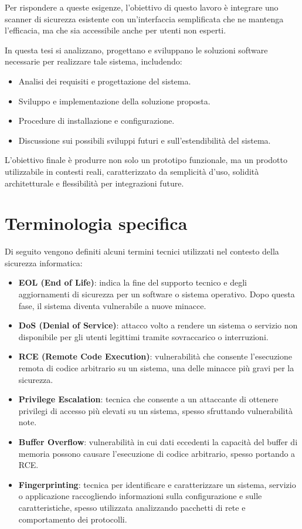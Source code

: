 Per rispondere a queste esigenze, l'obiettivo di questo lavoro è integrare uno scanner di sicurezza esistente con un'interfaccia semplificata che ne mantenga l'efficacia, ma che sia accessibile anche per utenti non esperti.

In questa tesi si analizzano, progettano e sviluppano le soluzioni software necessarie per realizzare tale sistema, includendo:
\begin{itemize}
    \item Analisi dei requisiti e progettazione del sistema.
    \item Sviluppo e implementazione della soluzione proposta.
    \item Procedure di installazione e configurazione.
    \item Discussione sui possibili sviluppi futuri e sull'estendibilità del sistema.
\end{itemize}

L'obiettivo finale è produrre non solo un prototipo funzionale, ma un prodotto utilizzabile in contesti reali, caratterizzato da semplicità d'uso, solidità architetturale e flessibilità per integrazioni future.

\section{Terminologia specifica}
Di seguito vengono definiti alcuni termini tecnici utilizzati nel contesto della sicurezza informatica:

\begin{itemize}
    \item \textbf{EOL (End of Life)}: indica la fine del supporto tecnico e degli aggiornamenti di sicurezza per un software o sistema operativo. Dopo questa fase, il sistema diventa vulnerabile a nuove minacce.
    \item \textbf{DoS (Denial of Service)}: attacco volto a rendere un sistema o servizio non disponibile per gli utenti legittimi tramite sovraccarico o interruzioni.
    \item \textbf{RCE (Remote Code Execution)}: vulnerabilità che consente l'esecuzione remota di codice arbitrario su un sistema, una delle minacce più gravi per la sicurezza.
    \item \textbf{Privilege Escalation}: tecnica che consente a un attaccante di ottenere privilegi di accesso più elevati su un sistema, spesso sfruttando vulnerabilità note.
    \item \textbf{Buffer Overflow}: vulnerabilità in cui dati eccedenti la capacità del buffer di memoria possono causare l'esecuzione di codice arbitrario, spesso portando a RCE.
    \item \textbf{Fingerprinting}: tecnica per identificare e caratterizzare un sistema, servizio o applicazione raccogliendo informazioni sulla configurazione e sulle caratteristiche, spesso utilizzata analizzando pacchetti di rete e comportamento dei protocolli.
\end{itemize}